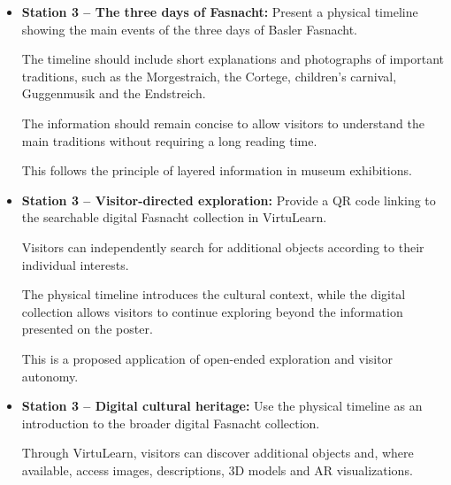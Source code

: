 \begin{itemize}
    The QR code creates a direct transition
    from the physical exhibition to the digital
    music station.

    This allows visitors with limited waiting
    time to read the poster, while interested
    visitors can continue exploring the instruments
    through audio, 3D and AR.

    This is a proposed application of layered
    museum interaction and supplementary
    digital content.
    \cite[p.~141]{hornecker_learning_2006}
    \cite[pp.~9--10]{zhou_meta-analytic_2022}

    \item \textbf{Station 3 -- The three days of Fasnacht:}
    Present a physical timeline showing the main events
    of the three days of Basler Fasnacht.

    The timeline should include short explanations
    and photographs of important traditions, such
    as the Morgestraich, the Cortege, children's
    carnival, Guggenmusik and the Endstreich.

    The information should remain concise to allow
    visitors to understand the main traditions
    without requiring a long reading time.

    This follows the principle of layered
    information in museum exhibitions.
    \cite[p.~141]{hornecker_learning_2006}

    \item \textbf{Station 3 -- Visitor-directed exploration:}
    Provide a QR code linking to the searchable
    digital Fasnacht collection in VirtuLearn.

    Visitors can independently search for
    additional objects according to their
    individual interests.

    The physical timeline introduces the cultural
    context, while the digital collection allows
    visitors to continue exploring beyond the
    information presented on the poster.

    This is a proposed application of open-ended
    exploration and visitor autonomy.
    \cite[pp.~708,~733]{franse_families_2021}

    \item \textbf{Station 3 -- Digital cultural heritage:}
    Use the physical timeline as an introduction
    to the broader digital Fasnacht collection.

    Through VirtuLearn, visitors can discover
    additional objects and, where available,
    access images, descriptions, 3D models
    and AR visualizations.


\end{itemize}
